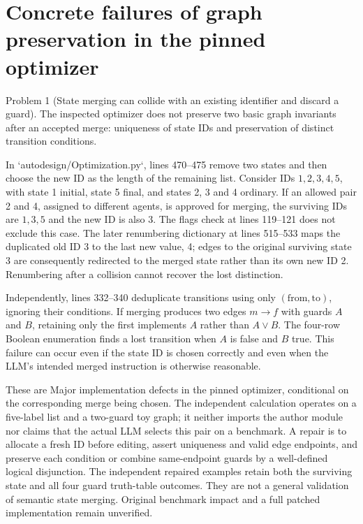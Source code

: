 \documentclass[10pt]{article}
\begin{document}
\section*{Concrete failures of graph preservation in the pinned optimizer}
Problem 1 (State merging can collide with an existing identifier and discard a guard).  The inspected optimizer does not preserve two basic graph invariants after an accepted merge: uniqueness of state IDs and preservation of distinct transition conditions.\par
In `autodesign/Optimization.py`, lines 470–475 remove two states and then choose the new ID as the length of the remaining list. Consider IDs \(1,2,3,4,5\), with state 1 initial, state 5 final, and states 2, 3 and 4 ordinary. If an allowed pair 2 and 4, assigned to different agents, is approved for merging, the surviving IDs are \(1,3,5\) and the new ID is also 3. The flags check at lines 119–121 does not exclude this case. The later renumbering dictionary at lines 515–533 maps the duplicated old ID 3 to the last new value, 4; edges to the original surviving state 3 are consequently redirected to the merged state rather than its own new ID 2. Renumbering after a collision cannot recover the lost distinction.\par
Independently, lines 332–340 deduplicate transitions using only \((\text{from},\text{to})\), ignoring their conditions. If merging produces two edges \(m\to f\) with guards \(A\) and \(B\), retaining only the first implements \(A\) rather than \(A\lor B\). The four-row Boolean enumeration finds a lost transition when \(A\) is false and \(B\) true. This failure can occur even if the state ID is chosen correctly and even when the LLM’s intended merged instruction is otherwise reasonable.\par
These are Major implementation defects in the pinned optimizer, conditional on the corresponding merge being chosen. The independent calculation operates on a five-label list and a two-guard toy graph; it neither imports the author module nor claims that the actual LLM selects this pair on a benchmark. A repair is to allocate a fresh ID before editing, assert uniqueness and valid edge endpoints, and preserve each condition or combine same-endpoint guards by a well-defined logical disjunction. The independent repaired examples retain both the surviving state and all four guard truth-table outcomes. They are not a general validation of semantic state merging. Original benchmark impact and a full patched implementation remain unverified.\par
\end{document}
